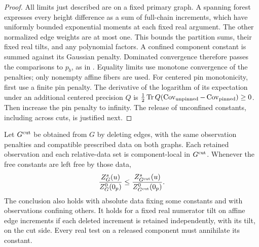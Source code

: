 \begin{proof}
All limits just described are on a fixed primary graph. A spanning
forest expresses every height difference as a sum of full-chain
increments, which have uniformly bounded exponential moments at
each fixed real argument. The other normalized edge weights are at
most one. This bounds the partition sums, their fixed real tilts,
and any polynomial factors. A confined component constant is
summed against its Gaussian penalty. Dominated convergence therefore
passes the comparisons to \(p_b\), as in \cite[Lemma~2.2]{C}.
Equality limits use monotone convergence of the penalties; only
nonempty affine fibers are used.
For centered pin monotonicity, first use a finite pin penalty.
The derivative of the logarithm of its expectation under an
additional centered precision \(Q\) is
\(\frac12\operatorname{Tr} Q(\operatorname{Cov}_{\rm unpinned}-\operatorname{Cov}_{\rm pinned})\ge0\).
Then increase the pin penalty to infinity.
The release of unconfined constants, including across cuts, is
justified next.
\end{proof}

\begin{lemma}\label{heights:cut-comparison}
Let \(G^{\rm cut}\) be obtained from \(G\) by deleting edges, with
the same observation penalties and compatible prescribed data on
both graphs. Each retained observation and each relative-data set
is component-local in \(G^{\rm cut}\). Whenever the free constants are left free by those
data,
\[
       \frac{Z_G^s(u)}{Z_G^0(0_p)}
       \le
       \frac{Z_{G^{\rm cut}}^s(u)}
            {Z_{G^{\rm cut}}^0(0_p)}.
\]
The conclusion also holds with absolute data fixing some constants
and with observations confining others. It holds for a fixed real
numerator tilt on affine edge increments if each deleted increment
is retained independently, with its tilt, on the cut side. Every
real test on a released component must annihilate its constant.
\end{lemma}

